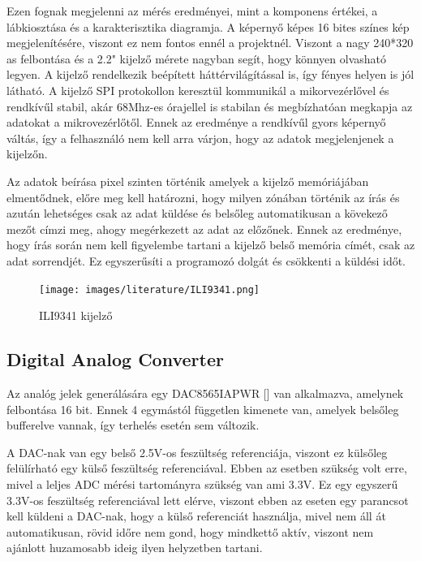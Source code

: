 Ezen fognak megjelenni az mérés eredményei, mint a komponens értékei, a lábkiosztása
és a karakterisztika diagramja. A képernyő képes 16 bites színes kép megjelenítésére,
viszont ez nem fontos ennél a projektnél. Viszont a nagy 240*320 as felbontása és
a 2.2" kijelző mérete nagyban segít, hogy könnyen olvasható legyen. A kijelző rendelkezik
beépített háttérvilágítással is, így fényes helyen is jól látható.
A kijelző SPI protokollon keresztül kommunikál a mikorvezérlővel és rendkívűl stabil,
akár 68Mhz-es órajellel is stabilan és megbízhatóan megkapja az adatokat a mikrovezérlőtől.
Ennek az eredménye a rendkívűl gyors képernyő váltás, így a felhasználó nem kell
arra várjon, hogy az adatok megjelenjenek a kijelzőn.

Az adatok beírása pixel szinten történik amelyek a kijelző memóriájában elmentődnek, 
előre meg kell határozni, hogy milyen
zónában történik az írás és azután lehetséges csak az adat küldése és belsőleg automatikusan
a kövekező mezőt címzi meg, ahogy megérkezett az adat az előzőnek. Ennek az eredménye,
hogy írás során nem kell figyelembe tartani a kijelző belső memória címét, csak az 
adat sorrendjét. Ez egyszerűsíti a programozó dolgát és csökkenti a küldési
időt.

\begin{figure}[H]
    \centering
    \texttt{[image: images/literature/ILI9341.png]}
    \caption{ILI9341 kijelző}
    \label{fig:ILI9341 kijelző}
\end{figure}

\subsection{Digital Analog Converter}

Az analóg jelek generálására egy DAC8565IAPWR [\cite{DAC}] van alkalmazva, 
amelynek felbontása 16 bit.
Ennek 4 egymástól független kimenete van, amelyek belsőleg bufferelve vannak,
így terhelés esetén sem változik. 

A DAC-nak van egy belső 2.5V-os feszültség referenciája,
viszont ez külsőleg felülírható egy külső feszültség referenciával. Ebben az 
esetben szükség volt erre, mivel a leljes ADC mérési tartományra szükség van
ami 3.3V. Ez egy egyszerű 3.3V-os feszültség referenciával lett elérve, viszont
ebben az eseten egy parancsot kell küldeni a DAC-nak, hogy a külső referenciát használja,
mivel nem áll át automatikusan, rövid időre nem gond, hogy mindkettő aktív, viszont
nem ajánlott huzamosabb ideig ilyen helyzetben tartani.

